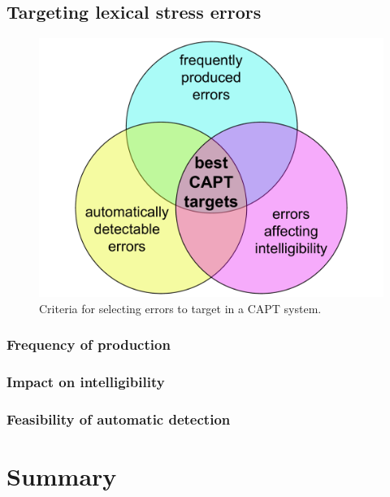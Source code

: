 	\subsection{Targeting lexical stress errors}
		\blindtext
		\begin{center}
		\begin{figure}[htb]
			\includegraphics[width=.7\textwidth]{../img/error-venn}
			\caption{Criteria for selecting errors to target in a CAPT system.}
			\label{fig:errors}
		\end{figure}
		\end{center}
		\subsubsection{Frequency of production}
		\subsubsection{Impact on intelligibility}
		\subsubsection{Feasibility of automatic detection}
		
\section{Summary}